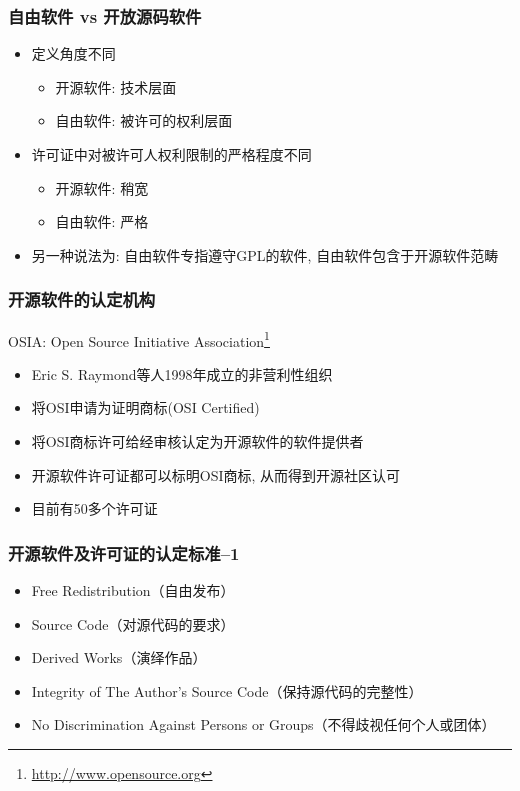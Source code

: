 \documentclass[compress]{beamer}
\begin{document}
\begin{frame}
\frametitle{自由软件 vs 开放源码软件}
\begin{itemize}
\item 定义角度不同
    \begin{itemize}
    \item 开源软件: 技术层面
    \item 自由软件: 被许可的权利层面
    \end{itemize}
\item 许可证中对被许可人权利限制的严格程度不同
    \begin{itemize}
    \item 开源软件: 稍宽
    \item 自由软件: 严格
    \end{itemize}
\item 另一种说法为: 自由软件专指遵守GPL的软件, 自由软件包含于开源软件范畴
\end{itemize}


\end{frame}

\begin{frame}
\frametitle{开源软件的认定机构}
OSIA: Open Source Initiative Association\footnote{\href{http://www.opensource.org}{http://www.opensource.org}}
\begin{itemize}
\item Eric S. Raymond等人1998年成立的非营利性组织
\item 将OSI申请为证明商标(OSI Certified)
\item 将OSI商标许可给经审核认定为开源软件的软件提供者
\item 开源软件许可证都可以标明OSI商标, 从而得到开源社区认可
\item 目前有50多个许可证
\end{itemize}
\end{frame}

\begin{frame}
\frametitle{开源软件及许可证的认定标准--1}
\begin{itemize}
\item Free Redistribution（自由发布）
\item Source Code（对源代码的要求）
\item Derived Works（演绎作品）
\item Integrity of The Author's Source Code（保持源代码的完整性）
\item No Discrimination Against Persons or Groups（不得歧视任何个人或团体）

\end{itemize}

\end{frame}
\end{document}
